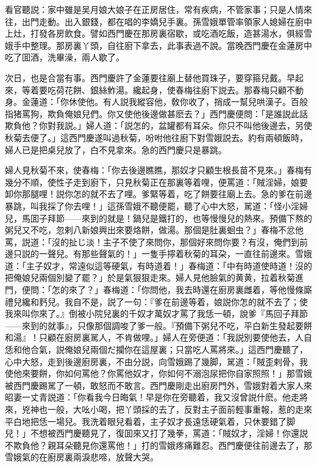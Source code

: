 看官聽説：家中雖是吴月娘大娘子在正房居住，常有疾病，不管家事；只是人情來往，出門走動。出入銀錢，都在唱的李嬌兒手裏。孫雪娥單管率領家人媳婦在廚中上灶，打發各房飲食。譬如西門慶在那房裏宿歇，或吃酒吃飯，造甚湯水，俱經雪娥手中整理。那房裏丫頭，自往廚下拿去，此事表過不說。當晚西門慶在金蓮房中吃了囬酒，洗畢澡，兩人歇了。

次日，也是合當有事。西門慶許了金蓮要往廟上替他買珠子，要穿箍兒戴。早起來，等着要吃荷花餅、銀絲鮓湯。纔起身，使春梅往廚下説去。那春梅只顧不動身。金蓮道：「你休使他。有人説我縱容他，敎你收了，捎成一幫兒哄漢子。百般指猪罵狗，欺負俺娘兒們。你又使他後邊做甚麽去？」西門慶便問：「是誰説此話欺負他？你對我説。」婦人道：「説怎的，盆罐都有耳朵。你只不叫他後邊去，另使秋菊去便了。」這西門慶遂叫過秋菊，吩咐他往廚下對雪娥説去。約有兩頓飯時，婦人已是把桌兒放了，白不見拿來。急的西門慶只是暴跳。

婦人見秋菊不來，使春梅：「你去後邊瞧瞧，那奴才只顧生根長苗不見來。」春梅有幾分不順，使性子走到廚下，只見秋菊正在那裏等着哩，便罵道：「賊淫婦，娘要卸你那腿哩！説你怎的就不去了哩。爹緊等着，吃了餅要往廟上去。急的爹在前邊暴跳，叫我採了你去哩！」這孫雪娥不聽便罷，聽了心中大怒，駡道：「怪小淫婦兒，馬囬子拜節——來到的就是！鍋兒是鐵打的，也等慢慢兒的熱來。預備下熬的粥兒又不吃，忽剌八新娘興出來要烙餅，做湯。那個是肚裏蛔虫？」春梅不忿他罵，説道：「沒的扯じ淡！主子不使了來問你，那個好來問你要？有沒，俺們到前邊只説的一聲兒。有那些聲氣的！」一隻手擰着秋菊的耳朶，一直往前邊來。雪娥道：「主子奴才，常遠似這等硬氣，有時道着！」春梅道：「中有時道使時道！沒的把俺娘兒兩個別變了罷？」於是氣狠狠走來。婦人見他臉氣的黄黄，拉着秋菊進門，便問：「怎的來了？」春梅道：「你問他，我去時還在廚房裏雌着，等他慢條廝禮兒纔和麫兒。我自不是，説了一句：『爹在前邊等着，娘説你怎的就不去了；使我來叫你來了。』倒被小院兒裏的千奴才萬奴才罵了我恁一頓，說爹『馬回子拜節——來到的就事』，只像那個調唆了爹一般。『預備下粥兒不吃，平白新生發起要餅和湯』！只顧在廚房裏駡人，不肯做哩。」婦人在旁便道：「我説別要使他去，人自恁和他合氣，説俺娘兒兩個だ攔你在這屋裏；只當吃人罵將來。」這西門慶聽了，心中大怒，走到後邊廚房裏，不由分説，向雪娥踢了幾脚，駡道：「賊歪剌骨，我使他來要餅，你如何罵他？你罵他奴才，你如何不溺泡尿把你自家照照！」那雪娥被西門慶踢駡了一頓，敢怒而不敢言。西門慶剛走出廚房門外，雪娥對着大家人來昭妻一丈青説道：「你看我今日晦氣！早是你在旁聽着，我又沒曾説什麽。他走將來，兇神也一般，大吆小喝，把丫頭採的去了，反對主子面前輕事重報，惹的走來平白地把恁一場兒。我洗着眼兒看着，主子奴才長遠恁硬氣着，只休要錯了脚兒！」不想被西門慶聽見了，復囬來又打了幾拳，罵道：「賊奴才，淫婦！你還説不欺負他？親耳朵聽見你還罵他！」打的雪娥疼痛難忍。西門慶便往前邊去了，那雪娥氣的在廚房裏兩淚悲啼，放聲大哭。

